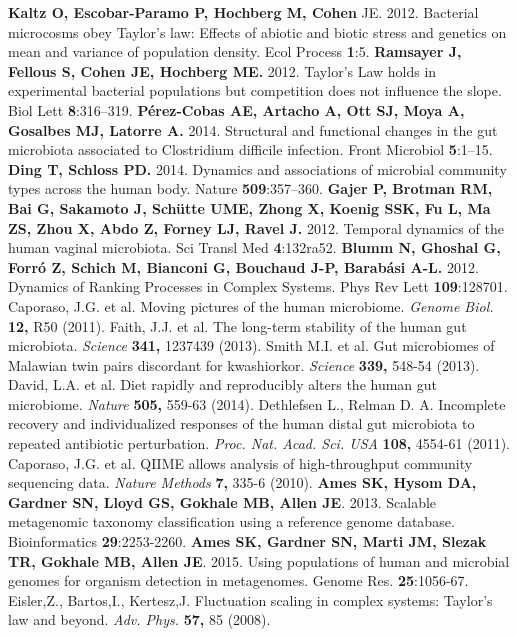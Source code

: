 \documentclass[12pt,oneside,letterpaper]{article}
\begin{document}
\begin{thebibliography}{99}
 {\bf Kaltz O, Escobar-Paramo P, Hochberg M, Cohen} JE. 2012. Bacterial microcosms obey Taylor’s law: Effects of abiotic and biotic stress and genetics on mean and variance of population density. Ecol Process {\bf 1}:5.
 {\bf Ramsayer J, Fellous S, Cohen JE, Hochberg ME.} 2012. Taylor’s Law holds in experimental bacterial populations but competition does not influence the slope. Biol Lett {\bf 8}:316–319.
 {\bf Pérez-Cobas AE, Artacho A, Ott SJ, Moya A, Gosalbes MJ, Latorre A.} 2014. Structural and functional changes in the gut microbiota associated to Clostridium difficile infection. Front Microbiol {\bf 5}:1–15.
 {\bf Ding T, Schloss PD.} 2014. Dynamics and associations of microbial community types across the human body. Nature {\bf 509}:357–360.
 {\bf Gajer P, Brotman RM, Bai G, Sakamoto J, Schütte UME, Zhong X, Koenig SSK, Fu L, Ma ZS, Zhou X, Abdo Z, Forney LJ, Ravel J.} 2012. Temporal dynamics of the human vaginal microbiota. Sci Transl Med {\bf 4}:132ra52.
 {\bf Blumm N, Ghoshal G, Forró Z, Schich M, Bianconi G, Bouchaud J-P, Barabási A-L.} 2012. Dynamics of Ranking Processes in Complex Systems. Phys Rev Lett {\bf 109}:128701.
 Caporaso, J.G. et al. Moving pictures of the human microbiome. {\it Genome Biol.} {\bf 12,} R50 (2011).
 Faith, J.J. et al. The long-term stability of the human gut microbiota. {\it Science} {\bf 341,} 1237439 (2013).
 Smith M.I. et al. Gut microbiomes of Malawian twin pairs discordant for kwashiorkor. {\it Science} {\bf 339,} 548-54 (2013).
 David, L.A. et al. Diet rapidly and reproducibly alters the human gut microbiome. {\it Nature} {\bf 505,} 559-63 (2014).
 Dethlefsen L., Relman D. A. Incomplete recovery and individualized responses of the human distal gut microbiota to repeated antibiotic perturbation. {\it Proc. Nat. Acad. Sci. USA} {\bf 108,} 4554-61 (2011).
 Caporaso, J.G. et al. QIIME allows analysis of high-throughput community sequencing data. {\it Nature Methods} {\bf 7,} 335-6 (2010).
 {\bf Ames SK, Hysom DA, Gardner SN, Lloyd GS, Gokhale MB, Allen JE}.  2013. Scalable metagenomic taxonomy classification using a reference genome database.  Bioinformatics {\bf 29}:2253-2260.
 {\bf Ames SK, Gardner SN, Marti JM, Slezak TR, Gokhale MB, Allen JE}. 2015. Using populations of human and microbial genomes for organism detection in metagenomes. Genome Res. {\bf 25}:1056-67.
 Eisler,Z., Bartos,I., Kertesz,J. Fluctuation scaling in complex systems: Taylor's law and beyond. {\it Adv. Phys.} {\bf 57,} 85 (2008).

\end{thebibliography}
\end{document}
